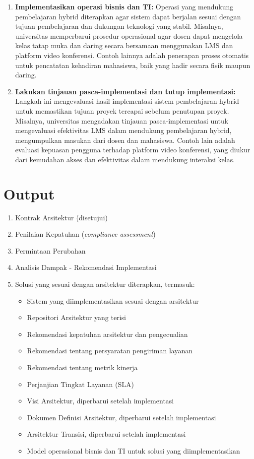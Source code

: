 \begin{enumerate}
	\item \textbf{Implementasikan operasi bisnis dan TI:} 
	Operasi yang mendukung pembelajaran hybrid diterapkan agar sistem dapat berjalan sesuai dengan tujuan pembelajaran dan dukungan teknologi yang stabil. Misalnya, universitas memperbarui prosedur operasional agar dosen dapat mengelola kelas tatap muka dan daring secara bersamaan menggunakan LMS dan platform video konferensi. Contoh lainnya adalah penerapan proses otomatis untuk pencatatan kehadiran mahasiswa, baik yang hadir secara fisik maupun daring.
	
	\item \textbf{Lakukan tinjauan pasca-implementasi dan tutup implementasi:} 
	Langkah ini mengevaluasi hasil implementasi sistem pembelajaran hybrid untuk memastikan tujuan proyek tercapai sebelum penutupan proyek. Misalnya, universitas mengadakan tinjauan pasca-implementasi untuk mengevaluasi efektivitas LMS dalam mendukung pembelajaran hybrid, mengumpulkan masukan dari dosen dan mahasiswa. Contoh lain adalah evaluasi kepuasan pengguna terhadap platform video konferensi, yang diukur dari kemudahan akses dan efektivitas dalam mendukung interaksi kelas.
\end{enumerate}

\section{Output}
\begin{enumerate}
	\item Kontrak Arsitektur (disetujui)
	\item Penilaian Kepatuhan (\textit{compliance assessment})
	\item Permintaan Perubahan
	\item Analisis Dampak - Rekomendasi Implementasi
	\item Solusi yang sesuai dengan arsitektur diterapkan, termasuk:
	\begin{itemize}
		\item Sistem yang diimplementasikan sesuai dengan arsitektur
		\item Repositori Arsitektur yang terisi
		\item Rekomendasi kepatuhan arsitektur dan pengecualian
		\item Rekomendasi tentang persyaratan pengiriman layanan
		\item Rekomendasi tentang metrik kinerja
		\item Perjanjian Tingkat Layanan (SLA)
		\item Visi Arsitektur, diperbarui setelah implementasi
		\item Dokumen Definisi Arsitektur, diperbarui setelah implementasi
		\item Arsitektur Transisi, diperbarui setelah implementasi
		\item Model operasional bisnis dan TI untuk solusi yang diimplementasikan
	\end{itemize}
\end{enumerate}

